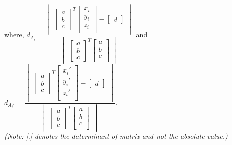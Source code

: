 \documentclass[12pt]{report}
\begin{document}
where, \(d_{A_{i}} =\dfrac{ \begin{vmatrix} \begin{bmatrix} a \\ b \\ c \end{bmatrix}^{T} \begin{bmatrix}  x_{i} \\ y_{i} \\ z_{i} \\ \end{bmatrix} - \begin{bmatrix} d \end{bmatrix} \end{vmatrix} } {\begin{vmatrix} \begin{bmatrix} a \\ b \\ c \end{bmatrix}^{T} \begin{bmatrix}  a \\ b \\ c \\ \end{bmatrix} \end{vmatrix} }\) and \(d_{A_{i}'} =\dfrac{ \begin{vmatrix} \begin{bmatrix} a \\ b \\ c \end{bmatrix}^{T} \begin{bmatrix}  x_{i}' \\ y_{i}' \\ z_{i}' \\ \end{bmatrix} - \begin{bmatrix} d \end{bmatrix} \end{vmatrix} } {\begin{vmatrix} \begin{bmatrix} a \\ b \\ c \end{bmatrix}^{T} \begin{bmatrix}  a \\ b \\ c \\ \end{bmatrix} \end{vmatrix} }\).\\
\textit{(Note: |.| denotes the determinant of matrix and not the absolute value.)}\\
\end{document}
